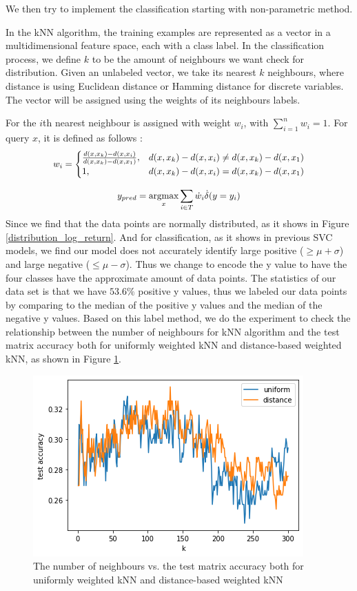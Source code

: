 \documentclass[9pt,twocolumn,twoside]{ilcss}
\newcommand\scalemath[2]{\scalebox{#1}{\mbox{\ensuremath{\displaystyle #2}}}}
\DeclareMathOperator*{\argmax}{argmax}
\begin{document}
We then try to implement the classification starting with non-parametric method.

In the kNN algorithm, the training examples are represented as a vector in a multidimensional feature space, each with a class label. In the classification process, we define $k$ to be the amount of neighbours we want check for distribution. Given an unlabeled vector, we take its nearest $k$ neighbours, where distance is using Euclidean distance or Hamming distance for discrete variables. The vector will be assigned using the weights of its neighbours labels.

For the $i$th nearest neighbour is assigned with weight $w_{i}$, with $\sum_{i=1}^n w_{i} = 1$. For query $x$, it is defined as follows \cite{samworth2012optimal}:
\[
\scalemath{0.95}{
w_{i}=
\begin{cases}
\frac{d(x,x_{k})-d(x,x_{i})}{d(x,x_{k})-d(x,x_{1})}, & d(x,x_{k})-d(x,x_{i}) \neq d(x,x_{k})-d(x,x_{1})\\
1, & d(x,x_{k})-d(x,x_{i}) = d(x,x_{k})-d(x,x_{1})
\end{cases}
}
\]

\[
\scalemath{0.95}{
y_{pred} = \argmax_x\sum_{i \in T}\dot w_{i} \dot \delta(y=y_{i})
}
\]
Since we find that the data points are normally distributed, as it shows in Figure \ref{distribution_log_return}. And for classification, as it shows in previous SVC models, we find our model does not accurately identify large positive ($\geq \mu + \sigma$) and large negative ($\leq \mu - \sigma$). Thus we change to encode the y value to have the four classes have the approximate amount of data points. The statistics of our data set is that we have $53.6\%$ positive y values, thus we labeled our data points by comparing to the median of the positive y values and the median of the negative y values. Based on this label method, we do the experiment to check the relationship between the number of neighbours for kNN algorithm and the test matrix accuracy both for uniformly weighted kNN and distance-based weighted kNN, as shown in Figure \ref{kNN_trend}.

\begin{figure}[h]
\centering
\includegraphics[width=0.8\linewidth]{kNN_trend.png}
\caption{The number of neighbours vs. the test matrix accuracy both for uniformly weighted kNN and distance-based weighted kNN}
\label{kNN_trend}
\end{figure}
\end{document}
